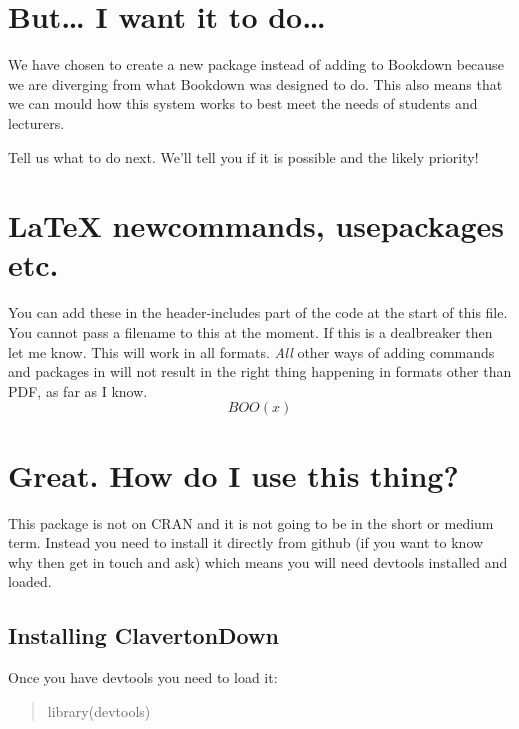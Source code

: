 \documentclass[
  10pt,
  english,
  a4paper]{article}
\theoremstyle{plain}
\theoremstyle{definition}
\theoremstyle{plain}
\theoremstyle{plain}
\theoremstyle{plain}
\theoremstyle{plain}
\theoremstyle{plain}
\theoremstyle{definition}
\theoremstyle{definition}
\theoremstyle{remark}
\theoremstyle{remark}
\begin{document}
\hypertarget{but-i-want-it-to-do}{%
\section{But\ldots{} I want it to do\ldots{}}\label{but-i-want-it-to-do}}

We have chosen to create a new package instead of adding to Bookdown because we are diverging from what Bookdown was designed to do. This also means that we can mould how this system works to best meet the needs of students and lecturers.

Tell us what to do next. We'll tell you if it is possible and the likely priority!

\hypertarget{latex-newcommands-usepackages-etc.}{%
\section{LaTeX newcommands, usepackages etc.}\label{latex-newcommands-usepackages-etc.}}

You can add these in the header-includes part of the code at the start of this file. You cannot pass a filename to this at the moment. If this is a dealbreaker then let me know. This will work in all formats. \emph{All} other ways of adding commands and packages in will not result in the right thing happening in formats other than PDF, as far as I know.
\[
BOO(x)
\]

\hypertarget{great.-how-do-i-use-this-thing}{%
\section{Great. How do I use this thing?}\label{great.-how-do-i-use-this-thing}}

This package is not on CRAN and it is not going to be in the short or medium term. Instead you need to install it directly from github (if you want to know why then get in touch and ask) which means you will need devtools installed and loaded.

\hypertarget{installing-clavertondown}{%
\subsection{Installing ClavertonDown}\label{installing-clavertondown}}

Once you have devtools you need to load it:

\begin{quote}
library(devtools)
\end{quote}
\end{document}
